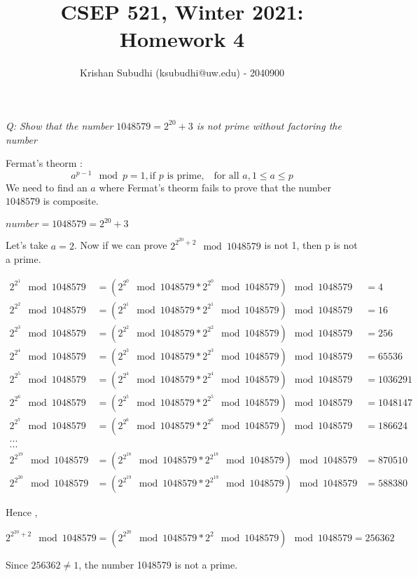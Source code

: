 \documentclass{homeworg}
\title{CSEP 521, Winter 2021: Homework 4}
\author{Krishan Subudhi (ksubudhi@uw.edu) - 2040900}
\begin{document}
\maketitle

\exercise
\emph{Q: Show that the number $1048579 = 2^{20} + 3$ is not prime without factoring the number}

Fermat's theorm : 
\[a^{p-1} \mod p = 1,  \text{if $p$ is prime,}\quad \text{for all } a,1 \le a \le p \]
We need to find an $a$ where Fermat's theorm fails to prove that the number $1048579$ is composite.

$number = 1048579 = 2^{20} + 3$

Let's take $a = 2$. Now if we can prove $2^{2^{20}+2} \mod 1048579$ is not 1, then p is not a prime.

\begin{align*}
2^{2^1} \mod 1048579 &= (2^{2^0} \mod 1048579 \ast 2^{2^0} \mod 1048579) \mod 1048579 &= 4\\
2^{2^2} \mod 1048579 &= (2^{2^1} \mod 1048579 \ast 2^{2^1} \mod 1048579) \mod 1048579 &= 16\\
2^{2^3} \mod 1048579 &= (2^{2^2} \mod 1048579 \ast 2^{2^2} \mod 1048579) \mod 1048579 &= 256\\
2^{2^4} \mod 1048579 &= (2^{2^3} \mod 1048579 \ast 2^{2^3} \mod 1048579) \mod 1048579 &= 65536\\
2^{2^5} \mod 1048579 &= (2^{2^4} \mod 1048579 \ast 2^{2^4} \mod 1048579) \mod 1048579 &= 1036291\\
2^{2^6} \mod 1048579 &= (2^{2^5} \mod 1048579 \ast 2^{2^5} \mod 1048579) \mod 1048579 &= 1048147\\
2^{2^7} \mod 1048579 &= (2^{2^6} \mod 1048579 \ast 2^{2^6} \mod 1048579) \mod 1048579 &= 186624\\
\texttt{...}\\
\texttt{...}\\
2^{2^{19}} \mod 1048579 &= (2^{2^{18}} \mod 1048579 \ast 2^{2^{18}} \mod 1048579) \mod 1048579 &= 870510\\
2^{2^{20}} \mod 1048579 &= (2^{2^{19}} \mod 1048579 \ast 2^{2^{19}} \mod 1048579) \mod 1048579 &= 588380
\end{align*}

Hence ,

\[
2^{2^{20}+2} \mod 1048579 = ( {2^{2^{20}} \mod 1048579 \ast 2^{2} \mod 1048579} ) \mod 1048579 = 256362
\]

Since $256362 \ne 1$, the number 1048579 is not a prime.

\newpage
\exercise
\end{document}
